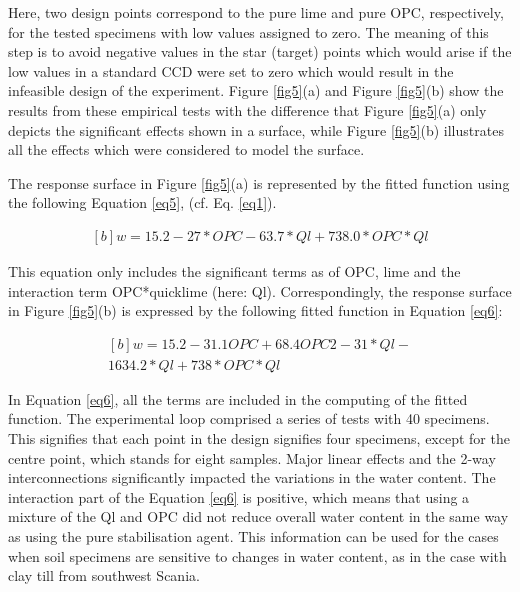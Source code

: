 \documentclass[eprint,
]{actapoly}
\begin{document}
Here, two design points correspond to the pure lime and pure OPC, respectively, for the tested specimens with low values assigned to zero. The meaning of this step is to avoid negative values in the star (target) points which would arise if the low values in a standard CCD were set to zero which would result in the infeasible design of the experiment. Figure \ref{fig5}(a) and Figure \ref{fig5}(b) show the results from these empirical tests with the difference that Figure \ref{fig5}(a) only depicts the significant effects shown in a surface, while Figure \ref{fig5}(b) illustrates all the effects which were considered to model the surface. 

The response surface in Figure \ref{fig5}(a) is represented by the fitted function using the following Equation \ref{eq5}, (cf. Eq. \ref{eq1}). 

\begin{equation}\label{eq5}
\begin{aligned}[b]
w=15.2 -27*OPC-63.7*Ql+738.0*OPC*Ql 
\end{aligned}
\end{equation}

This equation only includes the significant terms as of OPC, lime and the interaction term OPC*quicklime (here: Ql). Correspondingly, the response surface in Figure \ref{fig5}(b) is expressed by the following fitted function in Equation \ref{eq6}:

\begin{equation}\label{eq6}
\begin{aligned}[b]
w=15.2-31.1OPC+68.4OPC2-31*Ql-\\1634.2*Ql+738*OPC*Ql
\end{aligned}
\end{equation}

In Equation \ref{eq6}, all the terms are included in the computing of the fitted function. The experimental loop comprised a series of tests with 40 specimens. This signifies that each point in the design signifies four specimens, except for the centre point, which stands for eight samples. Major linear effects and the 2-way interconnections significantly impacted the variations in the water content. The interaction part of the Equation \ref{eq6} is positive, which means that using a mixture of the Ql and OPC did not reduce overall water content in the same way as using the pure stabilisation agent. This information can be used for the cases when soil specimens are sensitive to changes in water content, as in the case with clay till from southwest Scania. 
\end{document}
